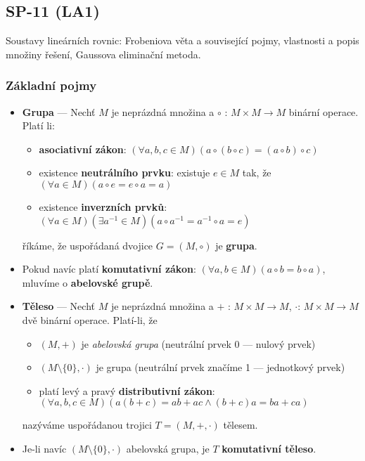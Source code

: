 \subsection{SP-11 (LA1)}
Soustavy lineárních rovnic: Frobeniova věta a související pojmy, vlastnosti a popis množiny řešení, Gaussova eliminační metoda.

\subsubsection*{Základní pojmy}
\begin{itemize}
	\item \textbf{Grupa} --- Nechť $M$ je neprázdná množina a $\circ$ : $M \times M \rightarrow M$ binární operace. Platí li:
	\begin{itemize}
		\item \textbf{asociativní zákon}:  $(\forall a, b, c \in M)(a \circ (b \circ c) = (a \circ b) \circ c)$
		\item existence \textbf{neutrálního prvku}: existuje $e \in M$ tak, že $(\forall a \in M)(a \circ e = e \circ a = a)$
		\item existence \textbf{inverzních prvků}: $(\forall a \in M)(\exists a^{-1} \in M)(a \circ a^{-1} = a^{-1} \circ a = e)$
	\end{itemize}
	říkáme, že uspořádaná dvojice $G=(M,\circ)$ je \textbf{grupa}.
	\item Pokud navíc platí \textbf{komutativní zákon}: $(\forall a, b \in M)(a \circ b = b \circ a)$, mluvíme o \textbf{abelovské grupě}.
	\item \textbf{Těleso} --- Nechť $M$ je neprázdná množina a $+$ : $M \times M \rightarrow M$, $\cdot$: $M \times M \rightarrow M$ dvě binární operace. Platí-li, že
	\begin{itemize}
		\item $(M,+)$ je \textit{abelovská grupa} (neutrální prvek 0 --- nulový prvek)
		\item $(M \setminus \{0\}, \cdot)$ je grupa (neutrální prvek značíme 1 --- jednotkový prvek)
		\item platí levý a pravý \textbf{distributivní zákon}: $(\forall a, b, c \in M)(a(b+c)=ab+ac \land (b+c)a = ba + ca)$ 
	\end{itemize}
	nazýváme uspořádanou trojici $T=(M,+,\cdot)$ tělesem.
	\item Je-li navíc $(M \setminus \{0\}, \cdot)$ abelovská grupa, je $T$ \textbf{komutativní těleso}.
\end{itemize}

